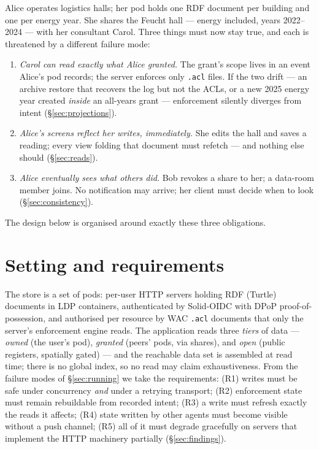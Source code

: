 \documentclass[11pt,a4paper]{article}
\theoremstyle{remark}
\newcommand{\code}[1]{\texttt{#1}}
\begin{document}
Alice operates logistics halls; her pod holds one RDF document per building and
one per energy year. She shares the Feucht hall --- energy included, years
2022--2024 --- with her consultant Carol. Three things must now stay true, and
each is threatened by a different failure mode:

\begin{enumerate}
\item \emph{Carol can read exactly what Alice granted.} The grant's scope lives
  in an event Alice's pod records; the server enforces only \code{.acl} files.
  If the two drift --- an archive restore that recovers the log but not the
  ACLs, or a new 2025 energy year created \emph{inside} an all-years grant ---
  enforcement silently diverges from intent (\S\ref{sec:projections}).
\item \emph{Alice's screens reflect her writes, immediately.} She edits the hall
  and saves a reading; every view folding that document must refetch --- and
  nothing else should (\S\ref{sec:reads}).
\item \emph{Alice eventually sees what others did.} Bob revokes a share to her;
  a data-room member joins. No notification may arrive; her client must decide
  when to look (\S\ref{sec:consistency}).
\end{enumerate}

The design below is organised around exactly these three obligations.

\section{Setting and requirements}\label{sec:setting}

The store is a set of pods: per-user HTTP servers holding RDF (Turtle) documents
in LDP containers, authenticated by Solid-OIDC with DPoP proof-of-possession, and
authorised per resource by WAC \code{.acl} documents that only the server's
enforcement engine reads. The application reads three \emph{tiers} of data ---
\emph{owned} (the user's pod), \emph{granted} (peers' pods, via shares), and
\emph{open} (public registers, spatially gated) --- and the reachable data set is
assembled at read time; there is no global index, so no read may claim
exhaustiveness. From the failure modes of \S\ref{sec:running} we take the
requirements: (R1) writes must be safe under concurrency \emph{and} under a
retrying transport; (R2) enforcement state must remain rebuildable from recorded
intent; (R3) a write must refresh exactly the reads it affects; (R4) state
written by other agents must become visible without a push channel; (R5) all of
it must degrade gracefully on servers that implement the HTTP machinery
partially (\S\ref{sec:findings}).
\end{document}
